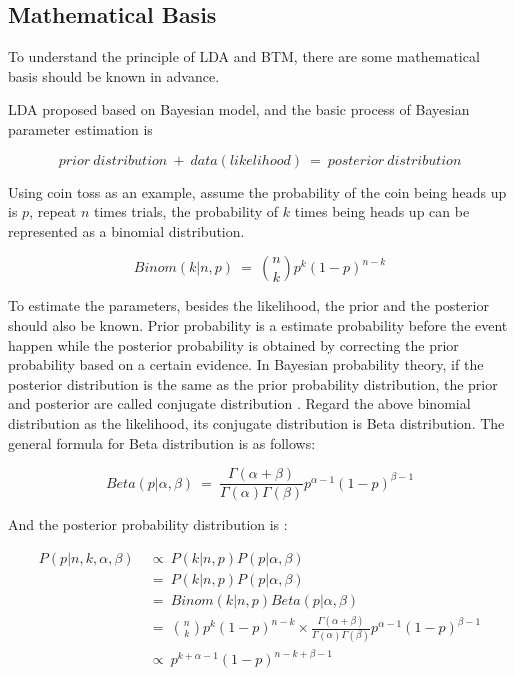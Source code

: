 \subsection{Mathematical Basis} \label{math}
To understand the principle of LDA and BTM, there are some mathematical basis should be known in advance. 

LDA proposed based on Bayesian model, and the basic process of Bayesian parameter estimation is 

   $$ prior\ distribution\ +\ data(likelihood)\ =\ posterior\ distribution$$

Using coin toss as an example, assume the probability of the coin being heads up is $p$, repeat $n$ times trials, the probability of $k$ times being heads up can be represented as a binomial distribution.

\begin{equation}
    Binom(k|n,p)\ =\ \binom{n}{k}p^k{(1-p)}^{n-k}
\end{equation}

To estimate the parameters, besides the likelihood, the prior and the posterior should also be known. Prior probability is a estimate probability before the event happen while the posterior probability is obtained by correcting the prior probability based on a certain evidence. In Bayesian probability theory, if the posterior distribution is the same as the prior probability distribution, the prior and posterior are called conjugate distribution \cite{enwiki:1013644991}. Regard the above binomial distribution as the likelihood, its conjugate distribution is Beta distribution. The general formula for Beta distribution is as follows:

\begin{equation}
    Beta(p|\alpha,\beta)\ =\ \frac{\Gamma(\alpha+\beta)}{\Gamma(\alpha)\Gamma(\beta)}p^{\alpha-1}{(1-p)}^{\beta-1}
\end{equation}

And the posterior probability distribution is :

\begin{equation}
\begin{aligned}
    P(p|n,k,\alpha,\beta)\ &\propto\ P(k|n,p)P(p|\alpha, \beta)\\
    &=\ P(k|n,p)P(p|\alpha,\beta)\\
    &=\ Binom(k|n,p)Beta(p|\alpha,\beta)\\
    &=\ \binom{n}{k}p^k{(1-p)}^{n-k}\times \frac{\Gamma(\alpha+\beta)}{\Gamma(\alpha)\Gamma(\beta)}p^{\alpha-1}{(1-p)}^{\beta-1} \\
    &\propto\ p^{k+\alpha -1}{(1-p)}^{n-k+\beta -1}
\end{aligned}
\end{equation}

